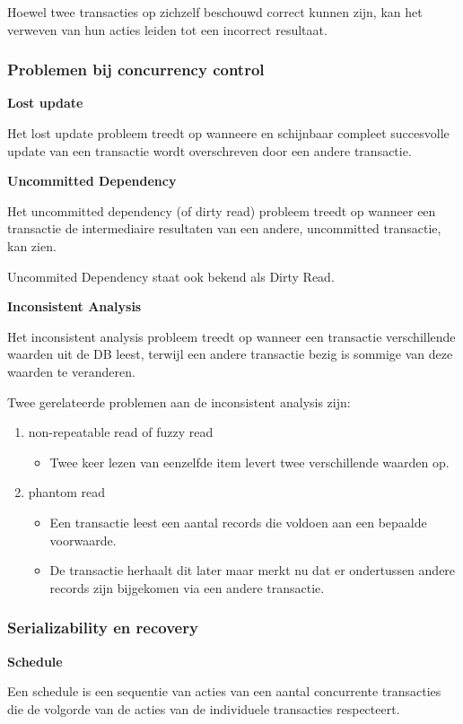 \documentclass[a4paper,12pt]{article}
\begin{document}
Hoewel twee transacties op zichzelf beschouwd correct kunnen zijn, kan het verweven van hun acties leiden tot een incorrect resultaat.

\subsubsection{Problemen bij concurrency control}
\textbf{Lost update}

Het lost update probleem treedt op wanneere en schijnbaar compleet succesvolle update van een transactie wordt overschreven door een andere transactie.

\textbf{Uncommitted Dependency}

Het uncommitted dependency (of dirty read) probleem treedt op wanneer een transactie de intermediaire resultaten van een andere, uncommitted transactie, kan zien.

Uncommited Dependency staat ook bekend als Dirty Read.

\textbf{Inconsistent Analysis}

Het inconsistent analysis probleem treedt op wanneer een transactie verschillende waarden uit de DB leest, terwijl een andere transactie bezig is sommige van deze waarden te veranderen.

Twee gerelateerde problemen aan de inconsistent analysis zijn:
\begin{enumerate}
\item non-repeatable read of fuzzy read
	\begin{itemize}
	\item Twee keer lezen van eenzelfde item levert twee verschillende waarden op.
	\end{itemize}
\item phantom read
	\begin{itemize}
	\item Een transactie leest een aantal records die voldoen aan een bepaalde voorwaarde.
	\item De transactie herhaalt dit later maar merkt nu dat er ondertussen andere records zijn bijgekomen via een andere transactie.
	\end{itemize}
\end{enumerate}

\subsubsection{Serializability en recovery}
\textbf{Schedule}

Een schedule is een sequentie van acties van een aantal concurrente transacties die de volgorde van de acties van de individuele transacties respecteert.
\end{document}
